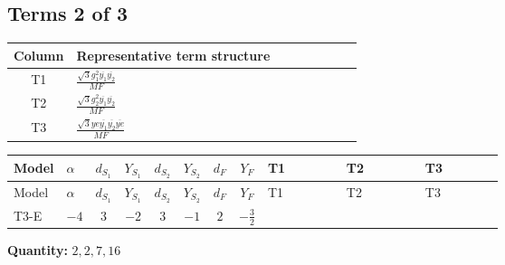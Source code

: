 \documentclass[8pt]{article}
\begin{document}
\begin{landscape}
\subsection*{Terms 2 of 3}
\begin{center}
\begin{tabular}{@{}c >{\raggedright\arraybackslash}p{0.82\linewidth}@{}}
\toprule
Column & Representative term structure \\
\midrule
T1 & \(\displaystyle \frac{\sqrt{3} g_{1}^{2} \overline{y_{1}} \overline{y_{2}}}{MF}\) \\
\midrule
T2 & \(\displaystyle \frac{\sqrt{3} g_{2}^{2} \overline{y_{1}} \overline{y_{2}}}{MF}\) \\
\midrule
T3 & \(\displaystyle \frac{\sqrt{3} ye \overline{y_{1}} \overline{y_{2}} \overline{ye}}{MF}\) \\
\midrule
\bottomrule
\end{tabular}
\end{center}
\smallskip
\tiny
\begin{longtable}{@{}llcccccc >{\raggedright\arraybackslash}p{0.21\linewidth} >{\raggedright\arraybackslash}p{0.21\linewidth} >{\raggedright\arraybackslash}p{0.21\linewidth}@{}}
\toprule
Model & $\alpha$ & $d_{S_1}$ & $Y_{S_1}$ & $d_{S_2}$ & $Y_{S_2}$ & $d_F$ & $Y_F$ & T1 & T2 & T3 \\
\midrule
\endfirsthead
\toprule
Model & $\alpha$ & $d_{S_1}$ & $Y_{S_1}$ & $d_{S_2}$ & $Y_{S_2}$ & $d_F$ & $Y_F$ & T1 & T2 & T3 \\
\midrule
\endhead
T3-E & $-4$ & $3$ & $-2$ & $3$ & $-1$ & $2$ & $-\frac{3}{2}$ & \scriptsize\adjustbox{max width=\linewidth}{$\begin{gathered} \frac{9 \sqrt{3} g_{1}^{2} \overline{y_{1}} \overline{y_{2}}}{8 MF}\end{gathered}$} & \scriptsize\adjustbox{max width=\linewidth}{$\begin{gathered} \frac{49 \sqrt{3} g_{2}^{2} \overline{y_{1}} \overline{y_{2}}}{24 MF}\end{gathered}$} & \scriptsize\adjustbox{max width=\linewidth}{$\begin{gathered} - \frac{\sqrt{3} ye \overline{y_{1}} \overline{y_{2}} \overline{ye}}{12 MF}\end{gathered}$} \\
\midrule
\bottomrule
\end{longtable}
\clearpage
\noindent\textbf{Quantity: }$\mathrm{2,2,7,16}$\par\smallskip

\end{landscape}
\end{document}

